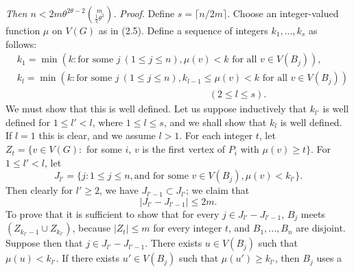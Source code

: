 \noindent\textit{Then $n<2m\theta^{2\theta-2}\binom{m}{\frac12\theta^2}$.}
\stmt
\textit{Proof}. Define $s=\lceil n/2m\rceil$. Choose an integer-valued function $\mu$ on $V(G)$
as in (2.5). Define a sequence of integers $k_1,..., k_s$ as follows:
\begin{align*}
&k_1=\min(k\colon\text{for some } j\ (1\le j\le n), \mu(v)<k \text{ for all } v\in V(B_j)),\\
&k_l=\min(k\colon\text{for some } j\ (1\le j\le n), k_{l-1}\le\mu(v)<k \text{ for all } v\in V(B_j))\\
&\hspace{20em}(2\le l\le s).
\end{align*}
We must show that this is well defined. Let us suppose inductively that $k_{l'}$ is
well defined for $1\le l'<l$, where $1\le l\le s$, and we shall show that $k_l$ is well
defined. If $l=1$ this is clear, and we assume $l>1$. For each integer $t$, let
$Z_t=\{v\in V(G)\colon$ for some $i$, $v$ is the first vertex of $P_i$ with $\mu(v)\ge t\}$. For
$1\le l'<l$, let
\begin{equation*}
J_{l'}=\{j\colon 1\le j\le n, \text{and for some } v\in V(B_j), \mu(v)<k_{l'}\}.
\end{equation*}
Then clearly for $l'\ge 2$, we have $J_{l'-1}\subset J_{l'}$; we claim that
\begin{equation*}
|J_{l'}-J_{l'-1}|\le 2m.
\end{equation*}
To prove that it is sufficient to show that for every $j\in J_{l'}-J_{l'-1}$, $B_j$ meets
$(Z_{k_{l'}-1}\cup Z_{k_{l'}})$, because $|Z_t|\le m$ for every integer $t$, and $B_1,..., B_n$ are
disjoint. Suppose then that $j\in J_{l'}-J_{l'-1}$. There exists $u\in V(B_j)$ such that
$\mu(u)<k_{l'}$. If there exists $u'\in V(B_j)$ such that $\mu(u')\ge k_{l'}$, then $B_j$ uses a
